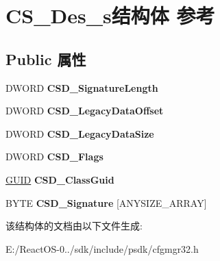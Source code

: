 \hypertarget{struct_c_s___des__s}{}\section{C\+S\+\_\+\+Des\+\_\+s结构体 参考}
\label{struct_c_s___des__s}
\subsection*{Public 属性}
\begin{DoxyCompactItemize}
\item 
\mbox{\label{struct_c_s___des__s_af27e3a17e241fbed9c2a8da3f6d3fb1e}} 
D\+W\+O\+RD {\bfseries C\+S\+D\+\_\+\+Signature\+Length}
\item 
\mbox{\label{struct_c_s___des__s_a6a1bfd014f6de7d9c790aef740393359}} 
D\+W\+O\+RD {\bfseries C\+S\+D\+\_\+\+Legacy\+Data\+Offset}
\item 
\mbox{\label{struct_c_s___des__s_a5f85db2f4657deb41f246fe220e258f3}} 
D\+W\+O\+RD {\bfseries C\+S\+D\+\_\+\+Legacy\+Data\+Size}
\item 
\mbox{\label{struct_c_s___des__s_a2a35b0de71dca131d8ef8f13ae502df9}} 
D\+W\+O\+RD {\bfseries C\+S\+D\+\_\+\+Flags}
\item 
\mbox{\label{struct_c_s___des__s_a53dad17dd9920cd8c0d27b292917d9d6}} 
\hyperlink{interface_g_u_i_d}{G\+U\+ID} {\bfseries C\+S\+D\+\_\+\+Class\+Guid}
\item 
\mbox{\label{struct_c_s___des__s_a69e1a8eac3c497d879c0094e69e58130}} 
B\+Y\+TE {\bfseries C\+S\+D\+\_\+\+Signature} \mbox{[}A\+N\+Y\+S\+I\+Z\+E\+\_\+\+A\+R\+R\+AY\mbox{]}
\end{DoxyCompactItemize}


该结构体的文档由以下文件生成\+:\begin{DoxyCompactItemize}
\item 
E\+:/\+React\+O\+S-\/0../sdk/include/psdk/cfgmgr32.\+h\end{DoxyCompactItemize}
